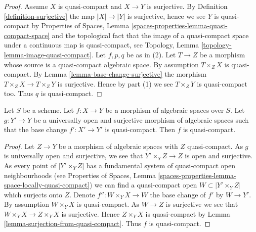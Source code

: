\begin{proof}
Assume $X$ is quasi-compact and $X \to Y$ is surjective. By
Definition \ref{definition-surjective}
the map $|X| \to |Y|$ is surjective, hence we see $Y$ is quasi-compact by
Properties of Spaces, Lemma \ref{spaces-properties-lemma-quasi-compact-space}
and the topological fact that the image of a quasi-compact space under a
continuous map is quasi-compact, see
Topology, Lemma \ref{topology-lemma-image-quasi-compact}.
Let $f, p, q$ be as in (2).
Let $T \to Z$ be a morphism whose source is a quasi-compact algebraic space.
By assumption $T \times_Z X$ is quasi-compact. By
Lemma \ref{lemma-base-change-surjective}
the morphism $T \times_Z X \to T \times_Z Y$ is surjective.
Hence by part (1) we see $T \times_Z Y$ is quasi-compact too.
Thus $q$ is quasi-compact.
\end{proof}

\begin{lemma}
\label{lemma-descent-quasi-compact}
Let $S$ be a scheme.
Let $f : X \to Y$ be a morphism of algebraic spaces over $S$.
Let $g : Y' \to Y$ be a universally open and surjective morphism of
algebraic spaces such that the base change $f' : X' \to Y'$ is quasi-compact.
Then $f$ is quasi-compact.
\end{lemma}

\begin{proof}
Let $Z \to Y$ be a morphism of algebraic spaces with $Z$ quasi-compact.
As $g$ is universally open and surjective, we see that
$Y' \times_Y Z \to Z$ is open and surjective. As every point of
$|Y' \times_Y Z|$ has a fundamental system of quasi-compact open
neighbourhoods (see
Properties of Spaces,
Lemma \ref{spaces-properties-lemma-space-locally-quasi-compact})
we can find a quasi-compact open $W \subset |Y' \times_Y Z|$
which surjects onto $Z$. Denote
$f'' : W \times_Y X \to W$ the base change of $f'$ by $W \to Y'$.
By assumption $W \times_Y X$ is quasi-compact. As $W \to Z$ is surjective
we see that $W \times_Y X \to Z \times_Y X$ is surjective.
Hence $Z \times_Y X$ is quasi-compact by
Lemma \ref{lemma-surjection-from-quasi-compact}.
Thus $f$ is quasi-compact.
\end{proof}

